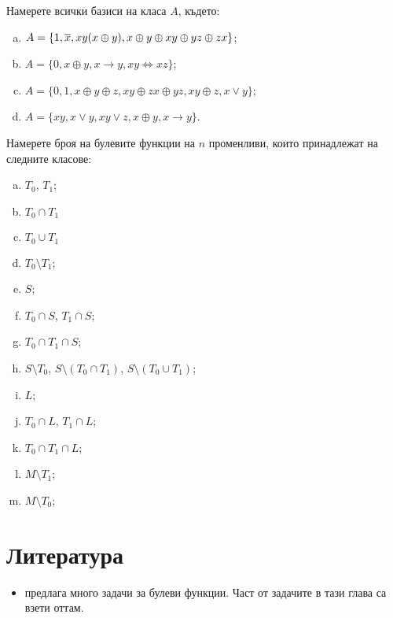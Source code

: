 \begin{problem}
  Намерете всички базиси на класа $A$, където:
  \begin{enumerate}[a)]
  \item 
    $A = \{1, \overline{x}, xy(x\oplus y), x \oplus y \oplus xy \oplus yz \oplus zx\}$;
  \item
    $A = \{0, x\oplus y, x \to y, xy \iff xz\}$;
  \item
    $A = \{0,1,x\oplus y \oplus z, xy \oplus zx \oplus yz, xy \oplus z, x \vee y\}$;
  \item
    $A = \{xy, x\vee y, xy\vee z, x\oplus y, x \to y\}$.
  \end{enumerate}
\end{problem}

\begin{problem}
  Намерете броя на булевите функции на $n$ променливи, които принадлежат на следните класове:
  \begin{enumerate}[a)]
  \item
    $T_0$, $T_1$;
  \item
    $T_0 \cap T_1$
  \item
    $T_0 \cup T_1$
  \item
    $T_0 \setminus T_1$;
  \item
    $S$;
  \item
    $T_0 \cap S$, $T_1 \cap S$;
  \item
    $T_0 \cap T_1 \cap S$;
  \item
    $S \setminus T_0$, $S \setminus (T_0 \cap T_1)$, $S \setminus (T_0 \cup T_1)$;
  \item
    $L$;
  \item
    $T_0 \cap L$, $T_1 \cap L$;
  \item
    $T_0 \cap T_1 \cap L$;
  \item
    $M \setminus T_1$;
  \item
    $M \setminus T_0$;
  \end{enumerate}
\end{problem}


\section*{Литература}

\begin{itemize}
\item 
  \cite[Глави 1 и 2]{gavrilov} предлага много задачи за булеви функции.
  Част от задачите в тази глава са взети оттам.
\end{itemize}

